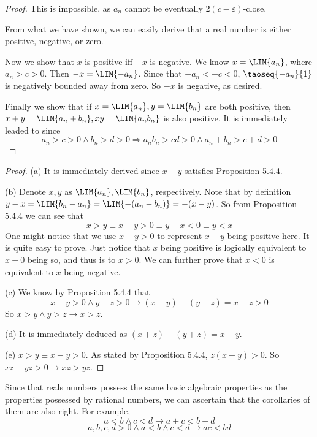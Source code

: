 \begin{proof}
This is impossible, as $a_n$ cannot be eventually $2(c-\varepsilon)$-close.

From what we have shown, we can easily derive that a real number is either positive, negative, or zero.

Now we show that $x$ is positive iff $-x$ is negative. We know $x = \LIM{a_n}$, where $a_n > c>0$. Then 
$-x = \LIM{-a_n}$. Since that $-a_n < -c <0$, $\taoseq{-a_n}{1}$ is negatively bounded away from zero. So $-x$ is 
negative, as desired.

Finally we show that if $x=\LIM{a_n},y=\LIM{b_n}$ are both positive, then $x+y=\LIM{a_n+b_n},xy = \LIM{a_nb_n}$ is also 
positive. It is immediately leaded to since 
\[
a_n >c>0 \wedge b_n >d>0 \Longrightarrow a_nb_n > cd>0 \wedge a_n+b_n > c+d>0
\]
\end{proof}

\begin{proof}
(a) It is immediately derived since $x-y$ satisfies Proposition 5.4.4.

(b)
Denote $x,y$ as $\LIM{a_n},\LIM{b_n}$, respectively. Note that by definition 
$y-x = \LIM{b_n-a_n} = \LIM{-(a_n-b_n)} = -(x-y)$. So from Proposition 5.4.4 we can see that
\[
x>y \equiv x-y>0 \equiv y-x<0 \equiv y<x
\]
One might notice that we use $x-y>0$ to represent $x-y$ being positive here. It is quite easy to prove. Just notice that 
$x$ being positive is logically equivalent to $x-0$ being so, and thus is to $x>0$. We can further prove that $x<0$ is 
equivalent to $x$ being negative.

(c)
We know by Proposition 5.4.4 that 
\[
x-y >0 \wedge y-z>0 \longrightarrow (x-y)+(y-z) = x-z >0
\]
So $x>y \wedge y>z \longrightarrow x>z$.

(d)
It is immediately deduced as $(x+z)-(y+z) = x-y$.

(e)
$x>y \equiv x-y>0$. As stated by Proposition 5.4.4, $z(x-y) >0$. So $xz-yz>0 \longrightarrow xz>yz$.

\end{proof}

\begin{prop} \label{prop.5.4.basicproperties}
Since that reals numbers possess the same basic algebraic properties as the properties possessed by rational numbers, we 
can ascertain that the corollaries of them are also right. For example,
\[
a<b\wedge c<d \longrightarrow a+c<b+d
\]
\[
a,b,c,d>0\wedge a<b\wedge c<d \longrightarrow ac<bd
\]
\end{prop}

